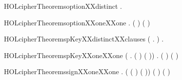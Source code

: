 \newcommand{\HOLcipherTheoremsdigestXXoneXXone}{\UseVerbatim{HOLcipherTheoremsdigestXXoneXXone}}
\begin{SaveVerbatim}{HOLcipherTheoremsoptionXXdistinct}
\HOLTokenTurnstile{} \HOLSymConst{\HOLTokenForall{}}.  \HOLSymConst{\HOLTokenNotEqual{}}  
\end{SaveVerbatim}
\newcommand{\HOLcipherTheoremsoptionXXdistinct}{\UseVerbatim{HOLcipherTheoremsoptionXXdistinct}}
\begin{SaveVerbatim}{HOLcipherTheoremsoptionXXoneXXone}
\HOLTokenTurnstile{} \HOLSymConst{\HOLTokenForall{}} . (  \HOLSymConst{=}  ) \HOLSymConst{\HOLTokenEquiv{}} ( \HOLSymConst{=} )
\end{SaveVerbatim}
\newcommand{\HOLcipherTheoremsoptionXXoneXXone}{\UseVerbatim{HOLcipherTheoremsoptionXXoneXXone}}
\begin{SaveVerbatim}{HOLcipherTheoremspKeyXXdistinctXXclauses}
\HOLTokenTurnstile{} (\HOLSymConst{\HOLTokenForall{}} .   \HOLSymConst{\HOLTokenNotEqual{}}  ) \HOLSymConst{\HOLTokenConj{}} \HOLSymConst{\HOLTokenForall{}} .   \HOLSymConst{\HOLTokenNotEqual{}}  
\end{SaveVerbatim}
\newcommand{\HOLcipherTheoremspKeyXXdistinctXXclauses}{\UseVerbatim{HOLcipherTheoremspKeyXXdistinctXXclauses}}
\begin{SaveVerbatim}{HOLcipherTheoremspKeyXXoneXXone}
\HOLTokenTurnstile{} (\HOLSymConst{\HOLTokenForall{}} . (  \HOLSymConst{=}  ) \HOLSymConst{\HOLTokenEquiv{}} ( \HOLSymConst{=} )) \HOLSymConst{\HOLTokenConj{}}
   \HOLSymConst{\HOLTokenForall{}} . (  \HOLSymConst{=}  ) \HOLSymConst{\HOLTokenEquiv{}} ( \HOLSymConst{=} )
\end{SaveVerbatim}
\newcommand{\HOLcipherTheoremspKeyXXoneXXone}{\UseVerbatim{HOLcipherTheoremspKeyXXoneXXone}}
\begin{SaveVerbatim}{HOLcipherTheoremssignXXoneXXone}
\HOLTokenTurnstile{} \HOLSymConst{\HOLTokenForall{}}   .
     (  ( ) \HOLSymConst{=}   ( )) \HOLSymConst{\HOLTokenEquiv{}}
     ( \HOLSymConst{=} ) \HOLSymConst{\HOLTokenConj{}} ( \HOLSymConst{=} )
\end{SaveVerbatim}
